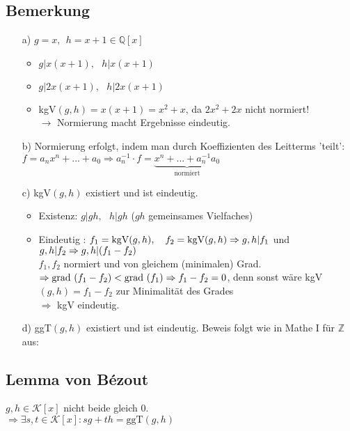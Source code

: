 \documentclass[12pt,titlepage, pdf]{article}
\newcommand{\K}{\mathcal{K}}
\renewcommand{\>}{\rightarrow}
\renewcommand{\*}{\cdot}
\begin{document}
\subsection{Bemerkung}
\label{4.30}
\begin{itemize}
	\item[a)] $g = x,~~ h = x+1 \in \mathds{Q}[x]$
	\begin{itemize}
		\item $g \vert x(x+1),~~~ h \vert x(x+1)$
		\item $g \vert 2x(x+1), ~~~h \vert 2x(x+1)$
		\item kgV$(g,h) = x(x+1)  = x^2 + x$, da $2x^2 +2x$ nicht normiert!\\
		$\rightarrow$ Normierung macht Ergebnisse eindeutig. 
	\end{itemize}
	\item[b)] Normierung erfolgt, indem man durch Koeffizienten des Leitterms 'teilt': \\
	$f = a_n x^n + ... + a_0 \Rightarrow a_n^{-1} \cdot f = \underbrace{x^n + ... + a_n^{-1}a_0}_{\text{normiert}}$
	\item[c)] kgV$(g,h)$ existiert und ist eindeutig.
	\begin{itemize}
		\item Existenz: $g \vert gh,~~~ h \vert gh$ ($gh$ gemeinsames Vielfaches)
		\item Eindeutig : $f_1 = \text{kgV}(g,h), ~~~f_2 = \text{kgV}(g,h)\\
		\Rightarrow g,h \vert f_1$ und $g,h \vert f_2\\
		\Rightarrow g,h \vert (f_1 - f_2)$\\
		$f_1,f_2$ normiert und von gleichem (minimalen) Grad.\\
		$\Rightarrow \text{grad }(f_1- f_2) < \text{grad } (f_1) \\
		\Rightarrow f_1 - f_2 = 0$, denn sonst wäre kgV$(g,h) = f_1 - f_2$  \qquad \Lightning zur Minimalität des Grades\\
		$\Rightarrow$ kgV eindeutig.
	\end{itemize}
	\item[d)] ggT$(g,h)$ existiert und ist eindeutig. Beweis folgt wie in Mathe I für $\mathbb{Z}$ aus:
\end{itemize}
\subsection{Lemma von Bézout}
$g,h \in \K[x]$ nicht beide gleich 0.\\
$\Rightarrow \exists s,t \in \K[x]: sg + th = \text{ggT}(g,h)$ \\
\end{document}
